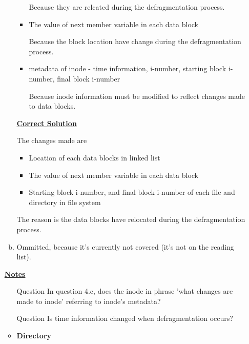 \documentclass[12pt]{article}
\begin{document}
\begin{enumerate}[1.]
\begin{enumerate}[a)]
\begin{itemize}
            \bigskip

            Because they are relcated during the defragmentation process.

            \item The value of next member variable in each data block

            \bigskip

            Because the block location have change during the defragmentation process.

            \item metadata of inode - time information, i-number, starting block i-number, final block i-number

            \bigskip

            Because inode information must be modified to reflect changes made to data blocks.

        \end{itemize}

        \bigskip

        \begin{mdframed}
        \underline{\textbf{Correct Solution}}

        \bigskip

        The changes made are

        \begin{itemize}
            \item Location of each data blocks in linked list
            \item The value of next member variable in each data block
            \item Starting block i-number, and final block i-number of each file and directory in
            file system
        \end{itemize}

        \bigskip

        \color{red}The reason is the data blocks have relocated during the defragmentation process.\color{black}

        \end{mdframed}

        \item

        Ommitted, because it's currently not covered (it's not on the reading list).
    \end{enumerate}

    \underline{\textbf{Notes}}

    \begin{itemize}
        \item [\color{blue}Question\color{black}] In question 4.c, does the inode in phrase 'what changes are made to inode' referring to inode's metadata?
        \item [\color{blue}Question\color{black}] Is time information changed when defragmentation occurs?
        \item \textbf{Directory}


\end{itemize}
\end{enumerate}
\end{document}
